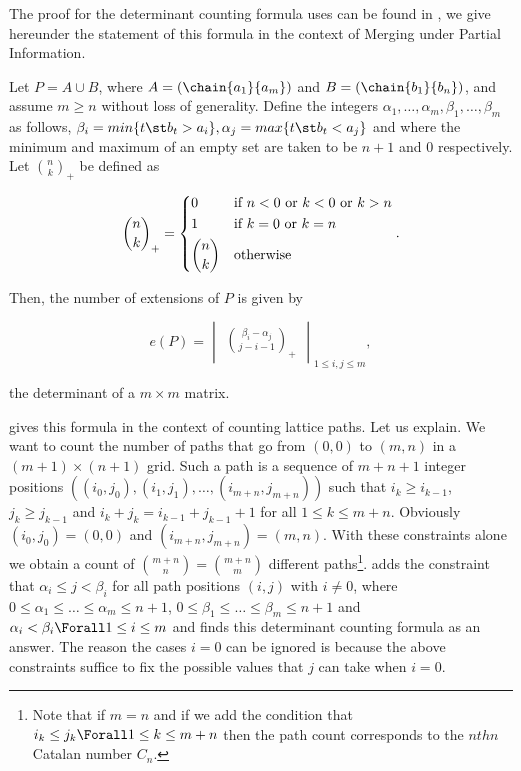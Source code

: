 The proof for the determinant counting formula \citet*{linial:1984} uses can be
found in \citet*{mohanty:1979}, we give hereunder the statement of this formula
in the context of Merging under Partial Information.

\begin{theorem}
Let \(P = A \cup B\), where \(A = (\chain{a_1}{a_m})\) and \(B =
(\chain{b_1}{b_n})\), and assume \(m \ge n\) without loss of generality. Define
the integers \(\alpha_1,\ldots,\alpha_m,\beta_1,\ldots,\beta_m\) as follows,
\(\beta_i = min\{t \st b_t > a_i\}, \alpha_j = max\{t \st b_t < a_j\}\) and
where the minimum and maximum of an empty set are taken to be \(n + 1\) and
\(0\) respectively. Let \(\binom{n}{k}_{+}\) be defined as

\begin{displaymath}
\binom{n}{k}_{+} =
\begin{dcases*}
0            & if  \(n < 0\)  or \(k < 0\)  or \(k > n\)\\
1            & if \(k = 0\)  or \(k = n\)\\
\binom{n}{k} & otherwise\\
\end{dcases*}.
\end{displaymath}

Then, the number of extensions of \(P\) is given by

\begin{displaymath}
e(P) =
\begin{vmatrix}
\binom{\beta_i - \alpha_j}{j - i - 1}_{+}
\end{vmatrix}_{1 \le i , j \le m},
\end{displaymath}

the determinant of a \(m \times m\) matrix.
\end{theorem}

\citet*{mohanty:1979} gives this formula in the context of counting lattice
paths. Let us explain. We want to count the number of paths that go from
\((0,0)\) to \((m,n)\) in a \((m+1) \times (n+1)\) grid. Such a path is a
sequence of \(m+n+1\) integer positions \(( (i_{0},j_{0}) , (i_{1},j_{1}) ,
\ldots , (i_{m+n},j_{m+n}) )\) such that \(i_{k} \ge i_{k-1}\), \(j_{k} \ge
j_{k-1}\) and \(i_{k} + j_{k} = i_{k-1} + j_{k-1} + 1\) for all \(1 \le k \le m
+ n\).  Obviously \((i_{0},j_{0}) = (0,0)\) and \((i_{m+n},j_{m+n}) = (m,n)\).
With these constraints alone we obtain a count of \(\binom{m+n}{n} =
\binom{m+n}{m} \) different paths\footnote{Note that if \(m = n\) and if we add
the condition that \(i_{k} \le j_{k} \Forall 1 \le k \le m + n\) then the path
count corresponds to the \(nth{n}\) Catalan number \(C_n\).}.
\citet*{mohanty:1979} adds the constraint that \(\alpha_i \le j < \beta_i\) for
all path positions \((i,j)\) with \(i \neq 0\), where \(0 \le
\alpha_1 \le \ldots \le \alpha_m \le n + 1\), \(0 \le \beta_1 \le \ldots \le
\beta_m \le n + 1\) and \(\alpha_i < \beta_i \Forall 1 \le i \le m\) and finds
this determinant counting formula as an answer. The reason the cases \(i = 0\)
can be ignored is because the above constraints suffice to fix
the possible values that \(j\) can take when \(i = 0\).

